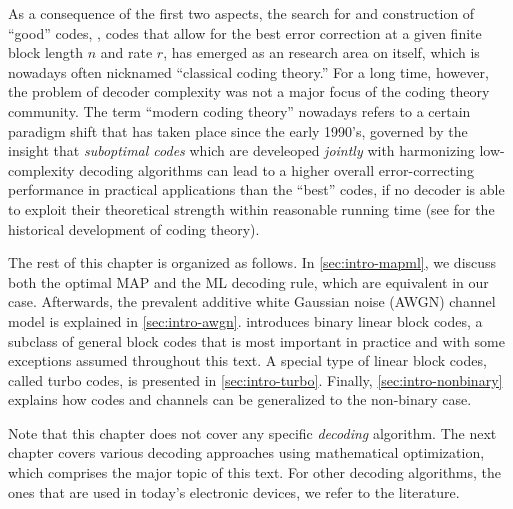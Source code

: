 As a consequence of the first two aspects, the search for and construction of \enquote{good} codes, \ie, codes that allow for the best error correction at a given finite block length $n$ and rate $r$, has emerged as an research area on itself, which is nowadays often nicknamed \enquote{classical coding theory.} For a long time, however, the problem of decoder complexity was not a major focus of the coding theory community. The term \enquote{modern coding theory} nowadays refers to a certain paradigm shift that has taken place since the early 1990's, governed by the insight that \emph{suboptimal codes} which are develeoped \emph{jointly} with harmonizing low-complexity decoding algorithms can lead to a higher overall error-correcting performance in practical applications than the \enquote{best} codes, if no decoder is able to exploit their theoretical strength within reasonable running time (see \cite{CostelloForney07RoadToCapacity} for the historical development of coding theory).

The rest of this chapter is organized as follows. In \cref{sec:intro-mapml}, we discuss both the optimal MAP and the ML decoding rule, which are equivalent in our case. Afterwards, the prevalent additive white Gaussian noise (AWGN) channel model is explained in \cref{sec:intro-awgn}.  introduces binary linear block codes, a subclass of general block codes that is most important in practice and with some exceptions assumed throughout this text. A special type of linear block codes, called turbo codes, is presented in \cref{sec:intro-turbo}. Finally, \cref{sec:intro-nonbinary} explains how codes and channels can be generalized to the non-binary case.

Note that this chapter does not cover any specific \emph{decoding} algorithm. The  next chapter covers various decoding approaches using mathematical optimization, which comprises the major topic of this text. For other decoding algorithms, \eg the ones that are used in today's electronic devices, we refer to the literature.


